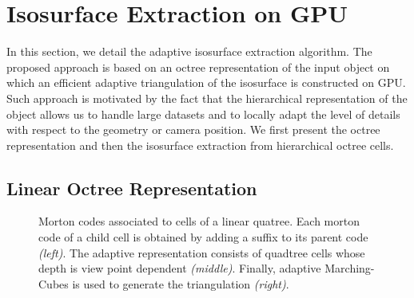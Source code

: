 \documentclass{llncs}
\begin{document}

\section{Isosurface Extraction on GPU}
\label{sec:isos-extr-gpu}

In this section, we detail the adaptive isosurface extraction
algorithm. The proposed approach is based on an octree representation
of the input object on which an efficient adaptive triangulation
of the isosurface is constructed on GPU. Such approach is motivated by
the fact that the hierarchical representation of the object allows us
to handle large datasets and to locally adapt the level of details
with respect to the geometry or camera position. We first present the
octree representation and then the isosurface extraction from
hierarchical octree cells.

\subsection{Linear Octree Representation}

\begin{figure}[!htbp]
  \begin{center}
  \end{center}
\caption{Morton codes associated to cells of a linear quatree. Each
   morton code of a child cell is obtained by adding a suffix to its
  parent code \emph{(left)}. The adaptive representation consists of
  quadtree cells whose depth is view point dependent
  \emph{(middle)}. Finally, adaptive Marching-Cubes is used to
  generate the triangulation \emph{(right)}.}
\label{fig_quadtree_partitionning}
\end{figure}
\end{document}
